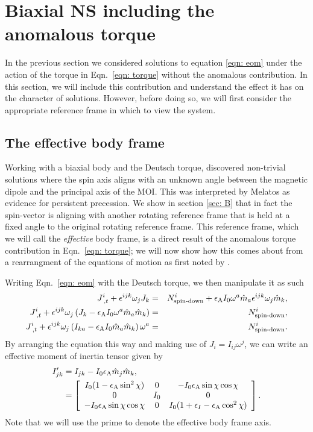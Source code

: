 \documentclass[../full_thesis/full_thesis.tex]{subfiles}
\begin{document}
\FloatBarrier

\section{Biaxial NS including the anomalous torque}
In the previous section we considered solutions to equation \eqref{eqn: eom}
under the action of the torque in Eqn.~\eqref{eqn: torque} without the
anomalous contribution. In this section, we will include this contribution and
understand the effect it has on the character of solutions. However, before
doing so, we will first consider the appropriate reference frame in which to
view the system.

\subsection{The effective body frame}
\label{sec: effective body frame}
Working with a biaxial body and the Deutsch torque, \cite{Melatos2000}
discovered non-trivial solutions where the spin axis aligns with an unknown
angle between the magnetic dipole and the principal axis of the MOI.  This was
interpreted by Melatos as evidence for persistent precession. We show in
section \ref{sec: B} that in fact the spin-vector is aligning with another
rotating reference frame that is held at a fixed angle to the original rotating
reference frame. This reference frame, which we will call the \emph{effective} body
frame, is a direct result of the anomalous torque contribution in
Eqn.~\eqref{eqn: torque}; we will now show how this comes about from a
rearrangment of the equations of motion as first noted by \citet{Glampedakis2010}.

Writing Eqn.~\eqref{eqn: eom} with the Deutsch torque, we then manipulate it as
such
\begin{eqnarray*}
J^{i}_{\;,t}+\epsilon^{ijk}\omega_{j}J_{k} & =
& N^{i}_{\textrm{spin-down}}+
\epsilon_{\mathrm{A}} I_{0}\omega^{a}\hat{m}_{a}\epsilon^{ijk}\omega_{j}\hat{m}_{k}, \\
J^{i}_{\;,t}+
\epsilon^{ijk}\omega_{j}\left(J_{k}-\epsilon_{\mathrm{A}} I_{0}\omega^{a}\hat{m}_{a}\hat{m}_{k}\right)
& = & N^{i}_{\textrm{spin-down}}, \\
J^{i}_{\;,t}+
\epsilon^{ijk}\omega_{j}\left(I_{ka}-\epsilon_{\mathrm{A}} I_{0}\hat{m}_{a}\hat{m}_{k}\right)\omega^{a}
& = & N^{i}_{\textrm{spin-down}}.
\end{eqnarray*}
By arranging the equation this way and making use of $J_{i}=I_{ij}\omega^{j}$,
we can write an effective moment of inertia tensor given by
\begin{align}
\begin{split}
I'_{jk}&=I_{jk}-I_{0}\epsilon_{\mathrm{A}}\hat{m}_{j}\hat{m}_{k}, \\
&= \left[
\begin{array}{ccc}
I_{0}(1-\epsilon_{\mathrm{A}}\sin^{2}\chi) & 0 & -I_{0}\epsilon_{\mathrm{A}}\sin\chi \cos \chi \\
0 & I_{0} & 0 \\  -I_{0}\epsilon_{\mathrm{A}}\sin\chi \cos \chi& 0 &
I_{0}(1+\epsilon_{I}-\epsilon_{\mathrm{A}}\cos^{2}\chi)
\end{array}
\right].
\end{split}
\label{eqn: effective MOI}
\end{align}
Note that we will use the prime to denote the effective body frame axis.
\end{document}

